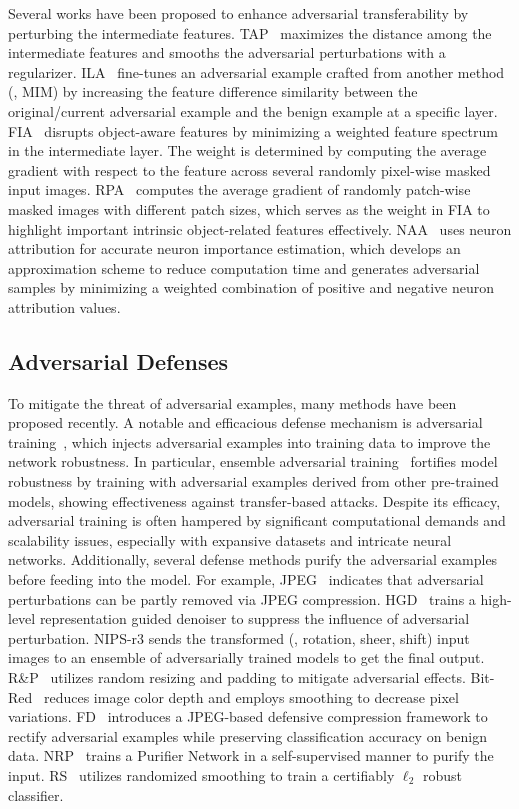Several works have been proposed to enhance adversarial transferability by perturbing the intermediate features. TAP~\cite{zhou2018transferable} maximizes the distance among the intermediate features and smooths the adversarial perturbations with a regularizer. ILA~\cite{huang2019enhancing} fine-tunes an adversarial example crafted from another method (\eg, MIM) by increasing the feature difference similarity between the original/current adversarial example and the benign example at a specific layer. FIA~\cite{wang2021feature} disrupts object-aware features by minimizing a weighted feature spectrum in the intermediate layer. The weight is determined by computing the average gradient with respect to the feature across several randomly pixel-wise masked input images. RPA~\cite{zhang2022enhancing} computes the average gradient of randomly patch-wise masked images with different patch sizes, which serves as the weight in FIA to highlight important intrinsic object-related features effectively. NAA~\cite{zhang2022improving} uses neuron attribution for accurate neuron importance estimation, which develops an approximation scheme to reduce computation time and generates adversarial samples by minimizing a weighted combination of positive and negative neuron attribution values.

\subsection{Adversarial Defenses}
To mitigate the threat of adversarial examples, many methods have been proposed recently. A notable and efficacious defense mechanism is adversarial training~\cite{goodfellow2015explaining, madry2018towards}, which injects adversarial examples into training data to improve the network robustness. In particular, ensemble adversarial training~\cite{Tram2018ensemble} fortifies model robustness by training with adversarial examples derived from other pre-trained models, showing effectiveness against transfer-based attacks. Despite its efficacy, adversarial training is often hampered by significant computational demands and scalability issues, especially with expansive datasets and intricate neural networks. Additionally, several defense methods purify the adversarial examples before feeding into the model. For example, JPEG~\cite{karolina2016study} indicates that adversarial perturbations can be partly removed via JPEG compression. HGD~\cite{liao2018defense} trains a high-level representation guided denoiser to suppress the influence of adversarial perturbation. NIPS-r3 sends the transformed (\eg, rotation, sheer, shift) input images to an ensemble of adversarially trained models to get the final output.  R\&P~\cite{xie2018mitigating} utilizes random resizing and padding to mitigate adversarial effects.  Bit-Red~\cite{xu2018feature} reduces image color depth and employs smoothing to decrease pixel variations. FD~\cite{liu2019feature} introduces a JPEG-based defensive compression framework to rectify adversarial examples while preserving classification accuracy on benign data. NRP~\cite{naseer2020self} trains a Purifier Network in a self-supervised manner to purify the input. RS~\cite{cohen2019certified} utilizes randomized smoothing to train a certifiably $\ell_2$ robust classifier. 


